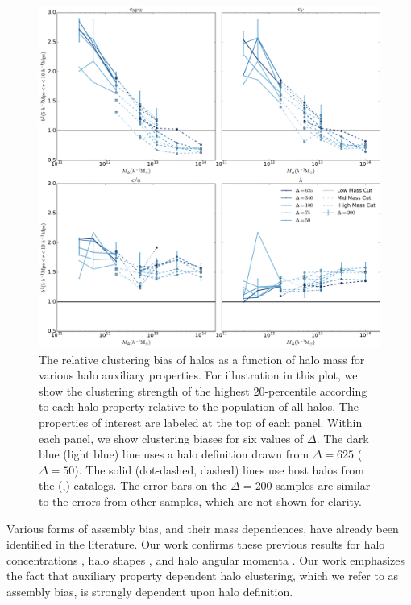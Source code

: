 \documentclass[usenatbib,fleqn]{mnras}
\begin{document}
\begin{figure}
	\centering
	\includegraphics[width=\textwidth]{biasplot.pdf}
	\caption{
The relative clustering bias of halos as a function of halo mass for various halo auxiliary properties. For illustration in this plot, we show the clustering strength of the highest 20-percentile according to each halo property relative to the population of all halos. The properties of interest are labeled at the top of each panel. Within each panel, we show clustering biases for six values of $\Delta$. The dark blue (light blue) line uses a halo definition drawn from $\Delta = 625$ ($\Delta = 50$). The solid (dot-dashed, dashed) lines use host halos from the \simA (\simB,\simC) catalogs. The error bars on the $\Delta=200$ samples are similar to the errors from other samples, which are not shown for clarity.
}
\label{fig:biascompare}
\end{figure}

Various forms of assembly bias, and their mass dependences, have already been identified in the literature. Our work confirms these previous results for halo concentrations \citep{wechsler_etal06,faltenbacher_white10,mao_etal15, sunayama_etal16}, halo shapes \citep{bett_etal07,hahn_etal07b,hahn_etal07b,faltenbacher_white10,vandaalen_etal12}, and halo angular momenta \citep{bett_etal07,hahn_etal07a,hahn_etal07b}. Our work emphasizes the fact that auxiliary property dependent halo clustering, which we refer to as assembly bias, is strongly dependent upon halo definition. 
\end{document}
